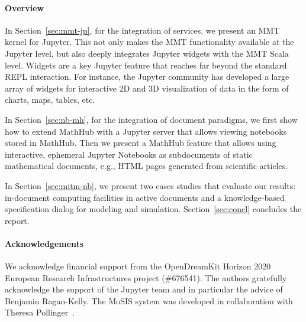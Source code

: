 \paragraph{Overview} In Section~\ref{sec:mmt-jp}, for the integration of services, we present an MMT kernel for Jupyter.
This not only makes the MMT functionality available at the Jupyter level, but also deeply integrates Jupyter widgets with the MMT Scala level.
Widgets are a key Jupyter feature that reaches far beyond the standard REPL interaction.
For instance, the Jupyter community has developed a large array of widgets for interactive 2D and 3D visualization of data in the form of charts, maps, tables, etc.

In Section~\ref{sec:nb-mh}, for the integration of document paradigms, we first show how to extend MathHub with a Jupyter server that allows viewing notebooks stored in MathHub.
Then we present a MathHub feature that allows using interactive, ephemeral Jupyter Notebooks as subdocuments of static mathematical documents, e.g., HTML pages generated from scientific articles.

In Section~\ref{sec:mitm-nb}, we present two cases studies that evaluate our results: in-document computing facilities in active documents and a knowledge-based specification dialog for modeling and simulation.
Section~\ref{sec:concl} concludes the report.

\paragraph{Acknowledgements}
We acknowledge financial support from the OpenDreamKit Horizon 2020 European Research Infrastructures project (\#676541).
The authors gratefully acknowledge the support of the Jupyter team and in particular the advice of Benjamin Ragan-Kelly.
The MoSIS system was developed in collaboration with Theresa Pollinger~\cite{PolKohKoe:kacse18}.

